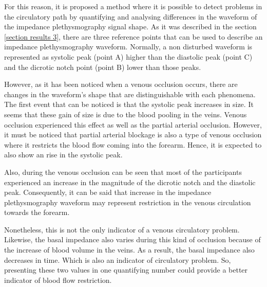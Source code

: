 For this reason, it is proposed a method where it is possible to detect problems in the circulatory path by quantifying and analysing differences in the waveform of the impedance plethysmography signal shape. As it was described in the section \ref{section results 3}, there are three reference points that can be used to describe an impedance plethysmography waveform. Normally, a non disturbed waveform is represented as systolic peak (point A) higher than the diastolic peak (point C) and the dicrotic notch point (point B) lower than those peaks. 

However, as it has been noticed when a venous occlusion occurs, there are changes in the waveform's shape that are distinguishable with each phenomena. The first event that can be noticed is that the systolic peak increases in size. It seems that these gain of size is due to the blood pooling in the veins. Venous occlusion experienced this effect as well as the partial arterial occlusion. However, it must be noticed that partial arterial blockage is also a type of venous occlusion where it restricts the blood flow coming into the forearm. Hence, it is expected to also show an rise in the systolic peak. 

Also, during the venous occlusion can be seen that most of the participants experienced an increase in the magnitude of the dicrotic notch and the diastolic peak. Consequently, it can be said that increase in the impedance plethysmography waveform may represent restriction in the venous circulation towards the forearm. 

Nonetheless, this is not the only indicator of a venous circulatory problem. Likewise, the basal impedance also varies during this kind of occlusion because of the increase of blood volume in the veins. As a result, the basal impedance also decreases in time. Which is also an indicator of circulatory problem. So, presenting these two values in one quantifying number could provide a better indicator of blood flow restriction. 

 


